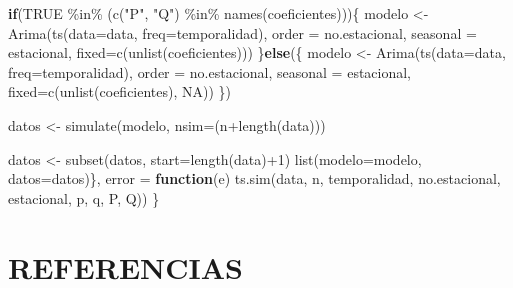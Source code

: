 \documentclass[
]{article}
\newenvironment{Shaded}{\begin{snugshade}}{\end{snugshade}}
\newcommand{\AttributeTok}[1]{\textcolor[rgb]{0.77,0.63,0.00}{#1}}
\newcommand{\ConstantTok}[1]{\textcolor[rgb]{0.00,0.00,0.00}{#1}}
\newcommand{\ControlFlowTok}[1]{\textcolor[rgb]{0.13,0.29,0.53}{\textbf{#1}}}
\newcommand{\DecValTok}[1]{\textcolor[rgb]{0.00,0.00,0.81}{#1}}
\newcommand{\FunctionTok}[1]{\textcolor[rgb]{0.00,0.00,0.00}{#1}}
\newcommand{\NormalTok}[1]{#1}
\newcommand{\OtherTok}[1]{\textcolor[rgb]{0.56,0.35,0.01}{#1}}
\newcommand{\SpecialCharTok}[1]{\textcolor[rgb]{0.00,0.00,0.00}{#1}}
\newcommand{\StringTok}[1]{\textcolor[rgb]{0.31,0.60,0.02}{#1}}
\begin{document}
\begin{Shaded}
\begin{Highlighting}[]
    \ControlFlowTok{if}\NormalTok{(}\ConstantTok{TRUE} \SpecialCharTok{\%in\%}\NormalTok{ (}\FunctionTok{c}\NormalTok{(}\StringTok{"P"}\NormalTok{, }\StringTok{"Q"}\NormalTok{) }\SpecialCharTok{\%in\%} \FunctionTok{names}\NormalTok{(coeficientes)))\{}
\NormalTok{        modelo }\OtherTok{\textless{}{-}} \FunctionTok{Arima}\NormalTok{(}\FunctionTok{ts}\NormalTok{(}\AttributeTok{data=}\NormalTok{data, }\AttributeTok{freq=}\NormalTok{temporalidad), }
                    \AttributeTok{order =}\NormalTok{ no.estacional, }
                    \AttributeTok{seasonal =}\NormalTok{ estacional,}
                    \AttributeTok{fixed=}\FunctionTok{c}\NormalTok{(}\FunctionTok{unlist}\NormalTok{(coeficientes)))}
\NormalTok{    \}}\ControlFlowTok{else}\NormalTok{(\{}
\NormalTok{        modelo }\OtherTok{\textless{}{-}} \FunctionTok{Arima}\NormalTok{(}\FunctionTok{ts}\NormalTok{(}\AttributeTok{data=}\NormalTok{data, }\AttributeTok{freq=}\NormalTok{temporalidad), }
                    \AttributeTok{order =}\NormalTok{ no.estacional, }
                    \AttributeTok{seasonal =}\NormalTok{ estacional,}
                    \AttributeTok{fixed=}\FunctionTok{c}\NormalTok{(}\FunctionTok{unlist}\NormalTok{(coeficientes), }\ConstantTok{NA}\NormalTok{))}
\NormalTok{    \})}
    
\NormalTok{    datos }\OtherTok{\textless{}{-}} \FunctionTok{simulate}\NormalTok{(modelo, }\AttributeTok{nsim=}\NormalTok{(n}\SpecialCharTok{+}\FunctionTok{length}\NormalTok{(data)))}
    
\NormalTok{    datos }\OtherTok{\textless{}{-}} \FunctionTok{subset}\NormalTok{(datos, }\AttributeTok{start=}\FunctionTok{length}\NormalTok{(data)}\SpecialCharTok{+}\DecValTok{1}\NormalTok{)}
    \FunctionTok{list}\NormalTok{(}\AttributeTok{modelo=}\NormalTok{modelo, }\AttributeTok{datos=}\NormalTok{datos)\}, }
    \AttributeTok{error =} \ControlFlowTok{function}\NormalTok{(e) }\FunctionTok{ts.sim}\NormalTok{(data, n, temporalidad,}
\NormalTok{                                        no.estacional, estacional, }
\NormalTok{                                        p, q, P, Q))}
\NormalTok{\}}
\end{Highlighting}
\end{Shaded}

\newpage

\section{REFERENCIAS}
\end{document}
